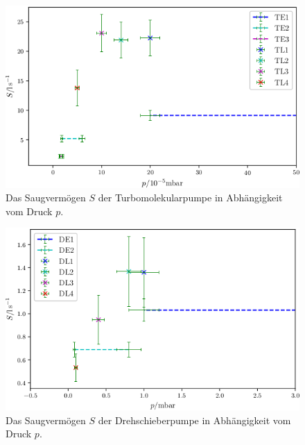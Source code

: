 \begin{figure}
\centering
\includegraphics[width=\linewidth-70pt,height=\textheight-70pt,keepaspectratio]{content/images/TGes.png}
\caption{Das Saugvermögen $S$ der Turbomolekularpumpe in Abhängigkeit vom Druck $p$.}
\label{fig:TGes}
\end{figure}

\begin{figure}
\centering
\includegraphics[width=\linewidth-70pt,height=\textheight-70pt,keepaspectratio]{content/images/DGes.png}
\caption{Das Saugvermögen $S$ der Drehschieberpumpe in Abhängigkeit vom Druck $p$.}
\label{fig:DGes}
\end{figure}
